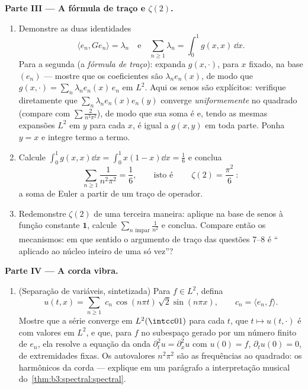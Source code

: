 \begin{problem}
\medskip
\noindent\textbf{Parte III --- A fórmula de traço e $\zeta(2)$.}
\begin{enumerate}[resume]
  \item Demonstre as duas identidades
        \[
        \langle e_n, Ge_n\rangle = \lambda_n
        \quad\text{e}\quad
        \sum_{n\geq1}\lambda_n = \int_0^1 g(x,x)\,\dd x .
        \]
        Para a segunda (a \emph{fórmula de traço}): expanda $g(x, \cdot)$, para
        $x$ fixado, na base $(e_n)$ --- mostre que os
        coeficientes são $\lambda_ne_n(x)$, de modo que $g(x, \cdot) = \sum_n\lambda_ne_n(x)\,e_n$ em $L^2$. Aqui os
        senos são explícitos: verifique diretamente que $\sum_n\lambda_ne_n(x)e_n(y)$ converge
        \emph{uniformemente} no quadrado (compare com $\sum
        \frac2{n^2\pi^2}$), de modo
        que sua soma é  e, tendo as mesmas expansões $L^2$
        em $y$ para cada $x$, é igual a $g(x,y)$ em toda
        parte. Ponha $y = x$ e integre termo a termo.
  \item Calcule $\int_0^1g(x,x)\dd x = \int_0^1x(1-x)\dd x =
        \frac16$ e conclua
        \[
        \sum_{n\geq1}\frac{1}{n^2\pi^2} = \frac16,
        \qquad\text{isto é}\qquad
        \boxed{\ \zeta(2) = \frac{\pi^2}{6}\ } :
        \]
        a soma de Euler a partir de um traço de operador.
  \item Redemonstre $\zeta(2)$ de uma terceira maneira: aplique  na
        base de senos à função constante $\mathbf 1$, calcule $\sum_{n \text{ ímpar}}\frac1{n^2}$ e conclua.
        Compare então os mecanismos: em que sentido o argumento de
        traço das questões 7--8 é `` aplicado ao núcleo inteiro
        de uma só vez''?
\end{enumerate}

\medskip
\noindent\textbf{Parte IV --- A corda vibra.}
\begin{enumerate}[resume]
  \item (Separação de variáveis, sintetizada) Para $f \in
        L^2$, defina
        \[
        u(t, x) = \sum_{n\geq1}\;c_n\,
        \cos(n\pi t)\,\sqrt2\sin(n\pi x),
        \qquad c_n = \langle e_n, f\rangle .
        \]
        Mostre que a série converge em $L^2(\intcc01)$ para cada $t$, que
        $t\mapsto u(t, \cdot)$ é  com valores em $L^2$, e que, para $f$ no
        subespaço gerado por um número finito de $e_n$, ela resolve
        a equação da onda $\partial_t^2u =
        \partial_x^2u$ com $u(0) = f$, $\partial_tu(0) = 0$, de extremidades fixas.
        Os autovalores $n^2\pi^2$ são as frequências ao quadrado: os
        harmônicos da corda --- explique em um parágrafo a
        interpretação musical do~\cref{thm:b3:spectral:spectral}.
\end{enumerate}


\end{problem}
